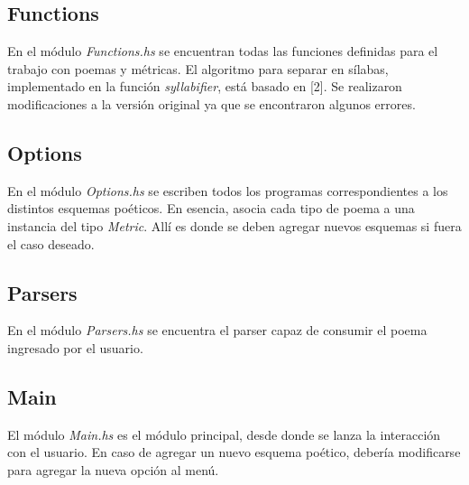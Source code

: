 \documentclass[12pt, a4paper]{article}
\begin{document}
\subsection*{Functions}
En el módulo \textit{Functions.hs} se encuentran todas las funciones definidas para el trabajo con poemas y métricas. El algoritmo para separar en sílabas, implementado en la función \textit{syllabifier}, está basado en [2]. Se realizaron modificaciones a la versión original ya que se encontraron algunos errores.
\subsection*{Options}
En el módulo \textit{Options.hs} se escriben todos los programas correspondientes a los distintos esquemas poéticos. En esencia, asocia cada tipo de poema a una instancia del tipo \textit{Metric}. Allí es donde se deben agregar nuevos esquemas si fuera el caso deseado. 
\subsection*{Parsers}
En el módulo \textit{Parsers.hs} se encuentra el parser capaz de consumir el poema ingresado por el usuario.
\subsection*{Main}
El módulo \textit{Main.hs} es el módulo principal, desde donde se lanza la interacción con el usuario. En caso de agregar un nuevo esquema poético, debería modificarse para agregar la nueva opción al menú.
\end{document}
